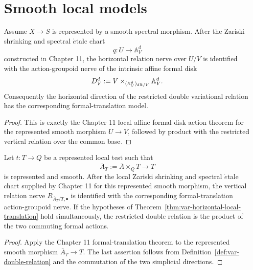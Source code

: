 \section{Smooth local models}
\label{sec:var-local-models}

\begin{theorem}
\label{thm:var-horizontal-local-translation}
Assume \(X\to S\) is represented by a smooth spectral morphism. After the Zariski shrinking and spectral \(\acute{e}\)tale chart
\[
    q:U\longrightarrow\mathbb A_V^d
\]
constructed in Chapter 11, the horizontal relation nerve over \(U/V\) is identified with the action-groupoid nerve of the intrinsic affine formal disk
\[
    D_V^d
    :=
    V\times_{(\mathbb A_V^d)_{\mathrm{dR}/V}}\mathbb A_V^d.
\]
Consequently the horizontal direction of the restricted double variational relation has the corresponding formal-translation model.
\end{theorem}

\begin{proof}
This is exactly the Chapter 11 local affine formal-disk action theorem for the represented smooth morphism \(U\to V\), followed by product with the restricted vertical relation over the common base.
\end{proof}

\begin{theorem}
\label{thm:var-vertical-local-translation}
Let \(t:T\to Q\) be a represented local test such that
\[
    \bar A_T:=\bar A\times_QT\longrightarrow T
\]
is represented and smooth. After the local Zariski shrinking and spectral \(\acute{e}\)tale chart supplied by Chapter 11 for this represented smooth morphism, the vertical relation nerve \(R_{\bar A_T/T,\bullet}\) is identified with the corresponding formal-translation action-groupoid nerve. If the hypotheses of Theorem~\ref{thm:var-horizontal-local-translation} hold simultaneously, the restricted double relation is the product of the two commuting formal actions.
\end{theorem}

\begin{proof}
Apply the Chapter 11 formal-translation theorem to the represented smooth morphism \(\bar A_T\to T\). The last assertion follows from Definition~\ref{def:var-double-relation} and the commutation of the two simplicial directions.
\end{proof}

